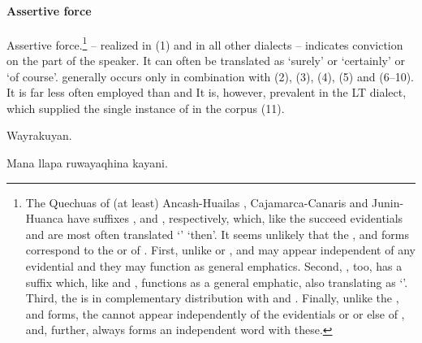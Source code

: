 \paragraph{Assertive force }\label{par:assertive}
Assertive force.\footnote{The Quechuas of (at least) Ancash-Huailas \citet[151]{Parker76gram}, Cajamarca-Canaris \citet[158]{Quesada76} and Junin-Huanca \citet[238--9]{CerroP76a} have suffixes ,  and , respectively, which, like the \SYQ{}  succeed evidentials and are most often translated `' `then'. It seems unlikely that the ,  and  forms correspond to the  or  of \SYQ{}. First, unlike  or ,  and  may appear independent of any evidential and they may function as general emphatics. Second, \SYQ{}, too, has a suffix  which, like  and , functions as a general emphatic, also translating as `'. Third, the \SYQ{}  is in complementary distribution with  and . Finally, unlike the ,  and  forms, the \SYQ{}  cannot appear independently of the evidentials  or  or else of , and, further, always forms an independent word with these.}  -- realized  in \CH{} (1) and  in all other dialects -- indicates conviction on the part of the speaker. It can often be translated as `surely' or `certainly' or `of course'.  generally occurs only in combination with  (2), (3),  (4), (5) and  (6--10). It is far less often employed than  and  It is, however, prevalent in the LT dialect\phono, which supplied the single instance of  in the corpus (11).

%
{Wayrakuyan.}%
{}%
{}{}%

%
{Mana llapa ruwayaqhina kayani.}%
{}%
{}{}%

